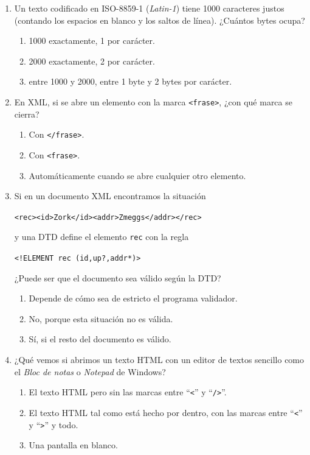\begin{enumerate}
\item Un texto codificado en ISO-8859-1 (\emph{Latin-1}) tiene 1000 caracteres justos (contando los espacios en blanco y los saltos de línea). ¿Cuántos bytes ocupa? \begin{enumerate} \item 1000 exactamente, 1 por carácter. \item 2000 exactamente, 2 por carácter. \item entre 1000 y 2000, entre 1 byte y 2 bytes por carácter. \end{enumerate} 

\item En XML, si se abre un elemento con la marca \verb|<frase>|, ¿con qué marca se cierra? \begin{enumerate} \item Con \verb|</frase>|. \item Con \verb|<frase>|. \item Automáticamente cuando se abre cualquier otro elemento. \end{enumerate} 

\item Si en un documento XML encontramos la situación \begin{center}\verb|<rec><id>Zork</id><addr>Zmeggs</addr></rec>|\end{center} y una DTD define el elemento \verb|rec| con la regla \begin{center}\verb|<!ELEMENT rec (id,up?,addr*)>|\end{center} ¿Puede ser que el documento sea válido según la DTD? \begin{enumerate} \item Depende de cómo sea de estricto el programa validador. \item No, porque esta situación no es válida. \item Sí, si el resto del documento es válido. \end{enumerate} 

\item ¿Qué vemos si abrimos un texto HTML con un editor de textos sencillo como el \emph{Bloc de notas} o \emph{Notepad} de Windows? \begin{enumerate} \item El texto HTML pero sin las marcas entre ``\verb|<|'' y ``\verb|/>|''. \item El texto HTML tal como está hecho por dentro, con las marcas entre ``\verb|<|'' y ``\verb|>|'' y todo. \item Una pantalla en blanco. \end{enumerate} 


\end{enumerate}
